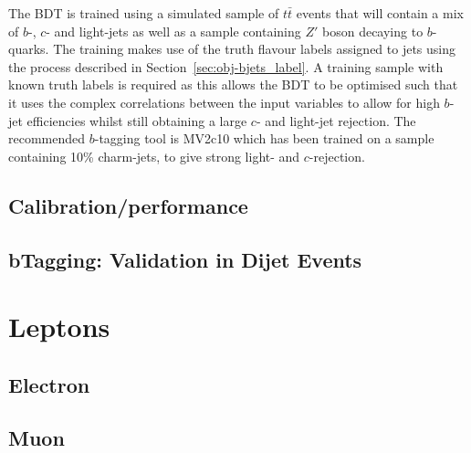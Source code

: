    The BDT is trained using a simulated sample of $t\bar{t}$ events that will contain a mix of  $b$-, $c$- and light-jets
   as well as a sample containing $Z'$ boson decaying to $b$-quarks.
   The training makes use of the truth flavour labels assigned to jets using the process described in Section~\ref{sec:obj-bjets_label}.
   A training sample with known truth labels is required as this allows the BDT to be optimised
   such that it uses the complex correlations between the input variables to allow for high $b$-jet efficiencies
   whilst still obtaining a large $c$- and light-jet rejection.
   The recommended $b$-tagging tool is MV2c10 which has been trained on a sample containing 10\% charm-jets, to give strong light- and $c$-rejection.
   
   
   \subsection{Calibration/performance}
   \subsection{bTagging: Validation in Dijet Events}
    
  \section{Leptons}   
  \subsection{Electron}
  \label{sec:obj-electron}
  \subsection{Muon}
  \label{sec:obj-muon}
    
